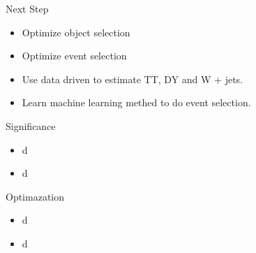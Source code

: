 \documentclass{beamer}
\begin{document}
\begin{frame}{Next Step}
    \begin{itemize}
    \item
       Optimize object selection
    \item
        Optimize event selection
    \item
        Use data driven to estimate TT, DY and W + jets.
    \item
       Learn machine learning methed to do event selection.
    \end{itemize}
\end{frame}

\begin{frame}{Significance}
    \begin{itemize}
    \item
       d
    \item
        d
    \end{itemize}
    \begin{table}[htbp] %
    \centering
    \footnotesize%
    \setlength\tabcolsep{2pt}%
    \resizebox{\textwidth}{!}{%
        \begin{tabular}{|c | c |c|} 
         \hline
         process & preselection &  step1 \\%
         \hline
         \hline
         2Tau 3L & 3 tight lepton & 2 medium tau\\
         \hline
        \end{tabular}
    }
    \caption{Subchannel}
    \label{table:4}
    \end{table}   
\end{frame}



\begin{frame}{Optimazation}
    \begin{itemize}
    \item
       d
    \item
        d
    \end{itemize}
\end{frame}
\end{document}
